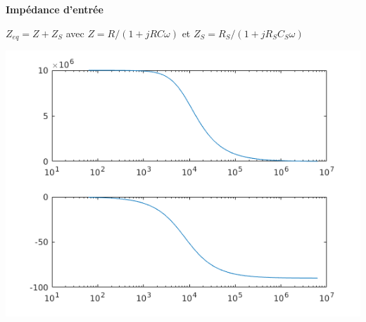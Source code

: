 \documentclass[a4paper,french]{paper}
\begin{document}
\qquad

\textbf{\large Impédance d'entrée}

$Z_{eq} = Z + Z_S$ avec $Z = R / (1 + j R C \omega)$  et $Z_S = R_S / (1 + j R_S C_S \omega)$


\begin{center}
	\includegraphics{images/TD/TD5_ex2_z.png}
\end{center}
\end{document}
